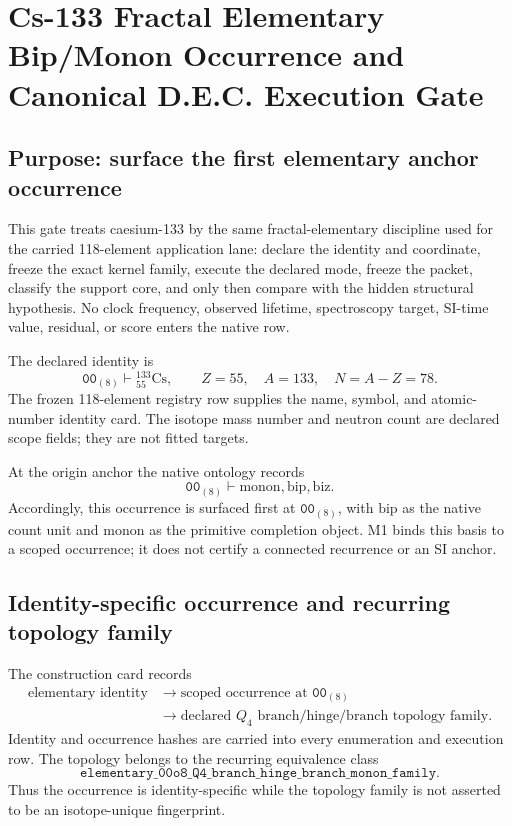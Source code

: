 \section[Cs-133 Fractal Elementary Occurrence Gate]{Cs-133 Fractal Elementary Bip/Monon Occurrence and\protect\\ Canonical D.E.C. Execution Gate}
\label{app:manual1-cs133-structural-gate}

\subsection{Purpose: surface the first elementary anchor occurrence}

This gate treats caesium-133 by the same fractal-elementary discipline used for the carried 118-element application lane: declare the identity and coordinate, freeze the exact kernel family, execute the declared mode, freeze the packet, classify the support core, and only then compare with the hidden structural hypothesis. No clock frequency, observed lifetime, spectroscopy target, SI-time value, residual, or score enters the native row.

The declared identity is
\[
\mathtt{00}_{(8)}\vdash {}^{133}_{55}\mathrm{Cs},
\qquad
Z=55,
\quad
A=133,
\quad
N=A-Z=78.
\]
The frozen 118-element registry row supplies the name, symbol, and atomic-number identity card. The isotope mass number and neutron count are declared scope fields; they are not fitted targets.

At the origin anchor the native ontology records
\[
\mathtt{00}_{(8)}\vdash \mathrm{monon},\mathrm{bip},\mathrm{biz}.
\]
Accordingly, this occurrence is surfaced first at \(\mathtt{00}_{(8)}\), with \(\mathrm{bip}\) as the native count unit and monon as the primitive completion object. M1 binds this basis to a scoped occurrence; it does not certify a connected recurrence or an SI anchor.

\subsection{Identity-specific occurrence and recurring topology family}

The construction card records
\[
\begin{aligned}
\text{elementary identity}
&\longrightarrow \text{scoped occurrence at }\mathtt{00}_{(8)}\\
&\longrightarrow \text{declared }Q_4\text{ branch/hinge/branch topology family}.
\end{aligned}
\]
Identity and occurrence hashes are carried into every enumeration and execution row. The topology belongs to the recurring equivalence class
\[
\texttt{elementary\_00o8\_Q4\_branch\_hinge\_branch\_monon\_family}.
\]
Thus the occurrence is identity-specific while the topology family is not asserted to be an isotope-unique fingerprint.


